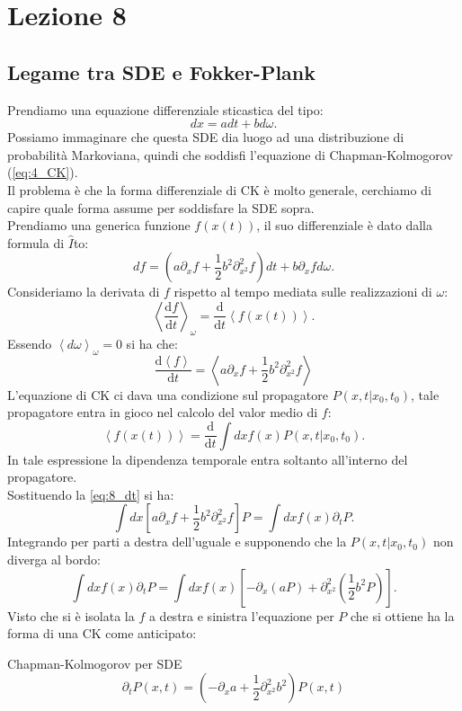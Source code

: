 \section{Lezione 8}%
\label{sub:Lezione 8}
\subsection{Legame tra SDE e Fokker-Plank}%
\label{sub:Legame tra SDE e Fokker-Plank}
Prendiamo una equazione differenziale sticastica del tipo:
\[
    dx = adt + bd\omega
.\] 
Possiamo immaginare che questa SDE dia luogo ad una distribuzione di probabilità Markoviana, quindi che soddisfi l'equazione di Chapman-Kolmogorov (\ref{eq:4_CK}). \\
Il problema è che la forma differenziale di CK è molto generale, cerchiamo di capire quale forma assume per soddisfare la SDE sopra.\\
Prendiamo una generica funzione $f(x(t))$, il suo differenziale è dato dalla formula di $\hat{I}$to:
\[
    df = \left(a\partial_{x}f + \frac{1}{2}b^2\partial^2_{x^2}f\right)dt + b \partial_{x}f d\omega
.\] 
Consideriamo la derivata di $f$ rispetto al tempo mediata sulle realizzazioni di $\omega$:
\[
    \left<\frac{\text{d} f}{\text{d} t} \right>_{\omega} = \frac{\text{d} }{\text{d} t} \left<f(x(t) )\right>
.\] 
Essendo $\left<d\omega\right>_{\omega}=0$ si ha che:
\begin{equation}
    \frac{\text{d} \left<f\right>}{\text{d} t} = \left<a \partial_{x}f +\frac{1}{2}b^2\partial^2_{x^2}f\right>
    \label{eq:8_dt}
\end{equation}
L'equazione di CK ci dava una condizione sul propagatore $P\left(x,t|x_0, t_0\right)$, tale propagatore entra in gioco nel calcolo del valor medio di $f$:
\[
    \left<f(x(t) ) \right> = \frac{\text{d} }{\text{d} t} \int  dx f(x) P\left(x,t|x_0, t_0\right)
.\] 
In tale espressione la dipendenza temporale entra soltanto all'interno del propagatore. \\
Sostituendo la \ref{eq:8_dt} si ha:
\[
    \int dx \left[a \partial_{x}f +\frac{1}{2}b^2\partial^2_{x^2}f\right]P = \int dx f(x) \partial_{t}P 
.\] 
Integrando per parti a destra dell'uguale e supponendo che la $P\left(x,t|x_0,t_0\right)$ non diverga al bordo:
\[
    \int dx f(x) \partial_{t}P = 
\int dx f(x) \left[-\partial_{x}(aP) + \partial^2_{x^2}\left(\frac{1}{2}b^2P\right)\right]
.\] 
Visto che si è isolata la $f$ a destra e sinistra l'equazione per $P$ che si ottiene ha la forma di una CK come anticipato:
\begin{redbox}{Chapman-Kolmogorov per SDE}
    \begin{equation}
    \partial_{t}P(x,t) = \left(-\partial_{x}a + \frac{1}{2}\partial^2_{x^2}b^2\right)P(x,t) 
    \label{eq:8_CK-SDE}
    \end{equation}
\end{redbox}
